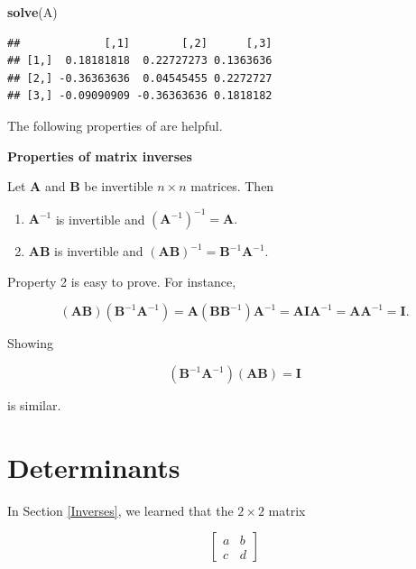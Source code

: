 \documentclass[
]{book}
\newenvironment{Shaded}{\begin{snugshade}}{\end{snugshade}}
\newcommand{\FunctionTok}[1]{\textcolor[rgb]{0.13,0.29,0.53}{\textbf{#1}}}
\newcommand{\NormalTok}[1]{#1}
\theoremstyle{definition}
\theoremstyle{definition}
\theoremstyle{definition}
\theoremstyle{definition}
\theoremstyle{remark}
\begin{document}
\begin{Shaded}
\begin{Highlighting}[]
\FunctionTok{solve}\NormalTok{(A)}
\end{Highlighting}
\end{Shaded}

\begin{verbatim}
##             [,1]        [,2]      [,3]
## [1,]  0.18181818  0.22727273 0.1363636
## [2,] -0.36363636  0.04545455 0.2272727
## [3,] -0.09090909 -0.36363636 0.1818182
\end{verbatim}

The following properties of are helpful.

\begin{propbox}

\textbf{Properties of matrix inverses}

Let \(\mathbf{A}\) and \(\mathbf{B}\) be invertible \(n\times n\) matrices. Then

\begin{enumerate}
\def\labelenumi{\arabic{enumi}.}
\item
  \(\mathbf{A}^{-1}\) is invertible and \((\mathbf{A}^{-1})^{-1}=\mathbf{A}.\)
\item
  \(\mathbf{A}\mathbf{B}\) is invertible and \((\mathbf{A}\mathbf{B})^{-1}=\mathbf{B}^{-1}\mathbf{A}^{-1}\).
\end{enumerate}

\end{propbox}

Property 2 is easy to prove. For instance,

\[(\mathbf{AB})(\mathbf{B}^{-1}\mathbf{A}^{-1})=\mathbf{A}(\mathbf{B}\mathbf{B}^{-1})\mathbf{A}^{-1}=\mathbf{A}\mathbf{I}\mathbf{A}^{-1}=\mathbf{A}\mathbf{A}^{-1}=\mathbf{I}.\]

Showing

\[(\mathbf{B}^{-1}\mathbf{A}^{-1})(\mathbf{AB})=\mathbf{I}\]

is similar.

\section{Determinants}\label{dets}

In Section \ref{Inverses}, we learned that the \(2\times 2\) matrix

\[\begin{bmatrix}
a & b\\c& d
\end{bmatrix}\]
\end{document}
